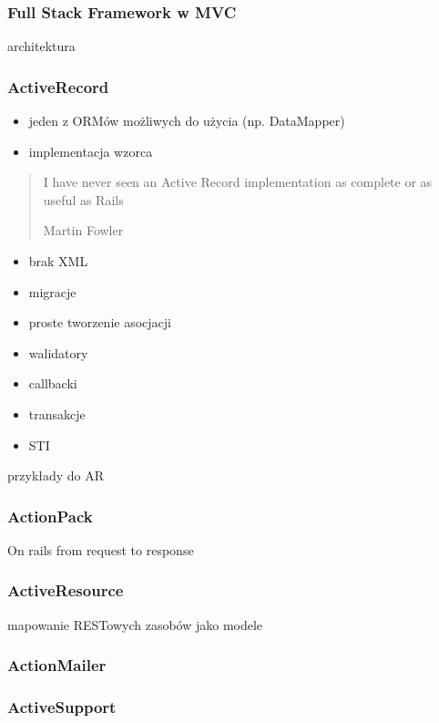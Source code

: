 \documentclass[12t]{beamer}
\begin{document}
\begin{frame}
  \frametitle{Full Stack Framework w MVC}
  architektura
\end{frame}

\begin{frame}
  \frametitle{ActiveRecord}
  \begin{itemize}
  \item jeden z ORMów możliwych do użycia (np. DataMapper)
  \item implementacja wzorca
  \end{itemize}
\end{frame}

\begin{frame}
  \begin{quote}
    I have never seen an Active Record implementation as complete or as useful as Rails

    \hfill Martin Fowler
  \end{quote}
\end{frame}

\begin{frame}
  \begin{itemize}
  \item brak XML
  \item migracje
  \item proste tworzenie asocjacji
  \item walidatory
  \item callbacki
  \item transakcje
  \item STI
  \end{itemize}
\end{frame}

\begin{frame}
  przykłady do AR
\end{frame}

\begin{frame}
  \frametitle{ActionPack}
  On rails from request to response
\end{frame}

\begin{frame}
  \frametitle{ActiveResource}
  mapowanie RESTowych zasobów jako modele
\end{frame}

\begin{frame}
  \frametitle{ActionMailer}
\end{frame}

\begin{frame}
  \frametitle{ActiveSupport}
\end{frame}
\end{document}
